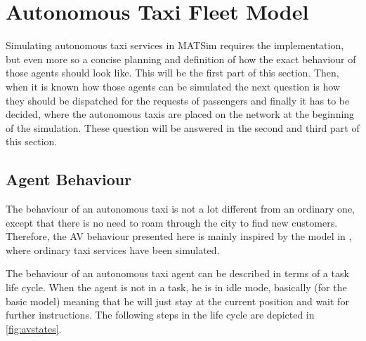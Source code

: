 \section{Autonomous Taxi Fleet Model}
\label{sec:avmodel}

Simulating autonomous taxi services in MATSim requires the implementation, but
even more so a concise planning and definition of how the exact behaviour of
those agents should look like. This will be the first part of this section. Then,
when it is known how those agents can be simulated the next question is how they
should be dispatched for the requests of passengers and finally it has to be decided,
where the autonomous taxis are placed on the network at the beginning of the simulation.
These question will be answered in the second and third part of this section.

\subsection{Agent Behaviour}

The behaviour of an autonomous taxi is not a lot different from an ordinary one,
except that there is no need to roam through the city to find new customers. Therefore,
the AV behaviour presented here is mainly inspired by the model in , where
ordinary taxi services have been simulated.

The behaviour of an autonomous taxi agent can be described in terms of a task life
cycle. When the agent is not in a task, he is in idle mode, basically (for the basic
model) meaning that he will just stay at the current position and wait for further
instructions. The following steps in the life cycle are depicted in \cref{fig:avstates}.

